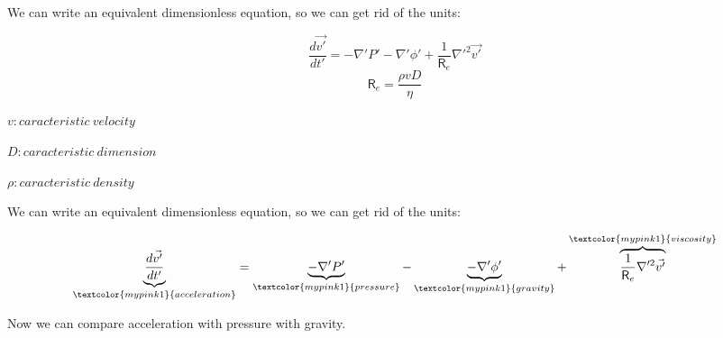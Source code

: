 \documentclass[]{beamer}
\begin{document}

  


  
\begin{frame}
  We can write an equivalent dimensionless equation, so we can get rid of the units:
   
     \begin{equation*}
    \frac{d\vec{v'}}{dt'}=-\nabla' P' -\nabla' \phi' +\frac{1}{\mathsf{R}_e} \nabla'^2 \vec{v'}
       \end{equation*}
   \pause
   \begin{equation*}
  \boxed{\mathsf{R}_e=\frac{\rho v D}{\eta}}
       \end{equation*}
  \pause
  \vspace{2mm}
  
  $v:caracteristic~velocity$
  
  $D:caracteristic~dimension$
  
   $\rho:caracteristic~density$
  
     \end{frame}


  
\begin{frame}
  We can write an equivalent dimensionless equation, so we can get rid of the units:
   
     \begin{equation*}
      \underbrace{ \frac{d\vec{v'}}{dt'}}_{\textcolor{mypink1}{acceleration}}=      \underbrace{-\nabla' P'}_{\textcolor{mypink1}{pressure}} -\underbrace{-\nabla' \phi'}_{\textcolor{mypink1}{gravity}}+ \overbrace{\frac{1}{\mathsf{R}_e} \nabla'^2 \vec{v'}}^{\textcolor{mypink1}{viscosity}}
       \end{equation*}

\vspace{5mm}
\pause

\textcolor{mypink1}{Now we can compare acceleration with pressure with gravity.}
  
     \end{frame}

          


  
\end{document}
